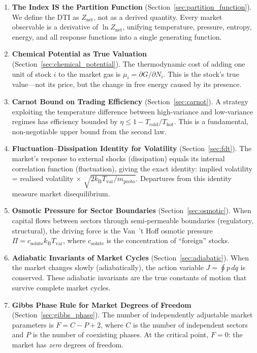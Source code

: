 \documentclass[twocolumn,10pt]{article}
\theoremstyle{remark}
\newcommand{\kB}{k_{\mathrm{B}}}
\newcommand{\Tvar}{T_{\mathrm{var}}}
\newcommand{\mproto}{m_{\mathrm{proto}}}
\newcommand{\Znet}{Z_{\mathrm{net}}}
\newcommand{\secref}[1]{Section~\ref{#1}}
\begin{document}
\begin{enumerate}[label=\arabic*.]
    \item \textbf{The Index IS the Partition Function} (\secref{sec:partition_function}).  We define the DTI as $\Znet$, not as a derived quantity.  Every market observable is a derivative of $\ln \Znet$, unifying temperature, pressure, entropy, energy, and all response functions into a single generating function.

    \item \textbf{Chemical Potential as True Valuation} (\secref{sec:chemical_potential}).  The thermodynamic cost of adding one unit of stock $i$ to the market gas is $\mu_i = \partial G / \partial N_i$.  This is the stock's true value---not its price, but the change in free energy caused by its presence.

    \item \textbf{Carnot Bound on Trading Efficiency} (\secref{sec:carnot}).  A strategy exploiting the temperature difference between high-variance and low-variance regimes has efficiency bounded by $\eta \leq 1 - T_{\mathrm{cold}}/T_{\mathrm{hot}}$.  This is a fundamental, non-negotiable upper bound from the second law.

    \item \textbf{Fluctuation--Dissipation Identity for Volatility} (\secref{sec:fdt}).  The market's response to external shocks (dissipation) equals its internal correlation function (fluctuation), giving the exact identity: implied volatility = realised volatility $\times$ $\sqrt{2\kB \Tvar / \mproto}$.  Departures from this identity measure market disequilibrium.

    \item \textbf{Osmotic Pressure for Sector Boundaries} (\secref{sec:osmotic}).  When capital flows between sectors through semi-permeable boundaries (regulatory, structural), the driving force is the Van~'t Hoff osmotic pressure $\Pi = c_{\mathrm{solute}} \kB \Tvar$, where $c_{\mathrm{solute}}$ is the concentration of ``foreign'' stocks.

    \item \textbf{Adiabatic Invariants of Market Cycles} (\secref{sec:adiabatic}).  When the market changes slowly (adiabatically), the action variable $J = \oint p \, dq$ is conserved.  These adiabatic invariants are the true constants of motion that survive complete market cycles.

    \item \textbf{Gibbs Phase Rule for Market Degrees of Freedom} (\secref{sec:gibbs_phase}).  The number of independently adjustable market parameters is $F = C - P + 2$, where $C$ is the number of independent sectors and $P$ is the number of coexisting phases.  At the critical point, $F = 0$: the market has \emph{zero} degrees of freedom.


\end{enumerate}
\end{document}
